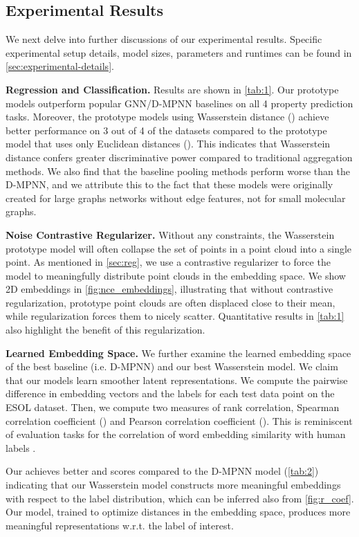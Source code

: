 \documentclass[letterpaper]{article} \usepackage{aaai22}  \usepackage{times}  \usepackage{helvet}  \usepackage{courier}  \usepackage[hyphens]{url}  \usepackage{graphicx} \urlstyle{rm} \def\UrlFont{\rm}  \usepackage{natbib}  \usepackage{caption} \DeclareCaptionStyle{ruled}{labelfont=normalfont,labelsep=colon,strut=off} \frenchspacing  \setlength{\pdfpagewidth}{8.5in}  \setlength{\pdfpageheight}{11in}  \usepackage{algorithm}
\begin{document}
\subsection{Experimental Results} \label{sec:contrastive-samples}
We next delve into further discussions of our experimental results. Specific experimental setup details, model sizes, parameters and runtimes can be found in \cref{sec:experimental-details}.

\textbf{Regression and Classification. } Results are shown in \cref{tab:1}. Our prototype models outperform popular GNN/D-MPNN baselines on all 4 property prediction tasks. Moreover, the prototype models using Wasserstein distance () achieve better performance on 3 out of 4 of the datasets compared to the prototype model that uses only Euclidean distances (). This indicates that Wasserstein distance confers greater discriminative power compared to traditional aggregation methods. We also find that the baseline pooling methods perform worse than the D-MPNN, and we attribute this to the fact that these models were originally created for large graphs networks without edge features, not for small molecular graphs. 



\textbf{Noise Contrastive Regularizer. } Without any constraints, the Wasserstein prototype model will often collapse the set of points in a point cloud into a single point. As mentioned in \cref{sec:reg}, we use a contrastive regularizer to force the model to meaningfully distribute point clouds in the embedding space. We show 2D embeddings in \cref{fig:nce_embeddings}, illustrating that without contrastive regularization, prototype point clouds are often displaced close to their mean, while  regularization forces them to nicely scatter. Quantitative results in \cref{tab:1} also highlight the benefit of this regularization.

\textbf{Learned Embedding Space. } We further examine the learned embedding space of the best baseline (i.e. D-MPNN) and our best Wasserstein model. We claim that our models learn smoother latent representations. We compute the pairwise difference in embedding vectors and the labels for each test data point on the ESOL dataset. Then, we compute two measures of rank correlation, Spearman correlation coefficient () and Pearson correlation coefficient (). This is reminiscent of evaluation tasks for the correlation of word embedding similarity with human labels \citep{luong2013better}.


Our  achieves better  and  scores compared to the D-MPNN model (\cref{tab:2}) indicating that our Wasserstein model constructs more meaningful embeddings with respect to the label distribution, which can be inferred also from \cref{fig:r_coef}. Our  model, trained to optimize distances in the embedding space, produces more meaningful representations w.r.t. the label of interest.
\end{document}
